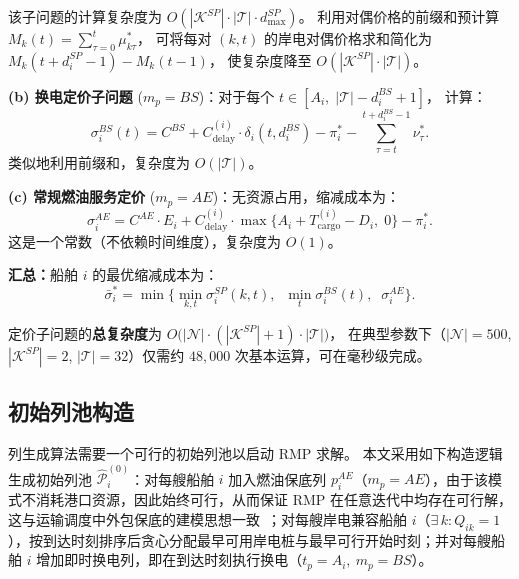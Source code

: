 \documentclass[UTF8, a4paper, 12pt]{ctexart}
\begin{document}
\noindent
该子问题的计算复杂度为 $O(|\mathcal{K}^{SP}| \cdot |\mathcal{T}| \cdot d_{\max}^{SP})$。
利用对偶价格的前缀和预计算
$M_{k}(t) = \sum_{\tau=0}^{t} \mu_{k\tau}^*$，
可将每对 $(k, t)$ 的岸电对偶价格求和简化为
$M_{k}(t + d_i^{SP} - 1) - M_{k}(t - 1)$，
使复杂度降至 $O(|\mathcal{K}^{SP}| \cdot |\mathcal{T}|)$。

\medskip
\noindent\textbf{(b) 换电定价子问题}
($m_p = BS$)：对于每个 $t \in [A_i,\; |\mathcal{T}| - d_i^{BS} + 1]$，
计算：
\begin{equation}
  \sigma_i^{BS}(t)
  = C^{BS} + C_{\text{delay}}^{(i)} \cdot \delta_i(t, d_i^{BS})
  - \pi_i^*
  - \sum_{\tau = t}^{t + d_i^{BS} - 1} \nu_{\tau}^*.
  \label{eq:price_bs}
\end{equation}
类似地利用前缀和，复杂度为 $O(|\mathcal{T}|)$。

\medskip
\noindent\textbf{(c) 常规燃油服务定价}
($m_p = AE$)：无资源占用，缩减成本为：
\begin{equation}
  \sigma_i^{AE}
  = C^{AE} \cdot E_i
  + C_{\text{delay}}^{(i)} \cdot \max\!\big\{A_i + T_{\text{cargo}}^{(i)} - D_i,\; 0\big\}
  - \pi_i^*.
  \label{eq:price_ae}
\end{equation}
这是一个常数（不依赖时间维度），复杂度为 $O(1)$。

\medskip
\noindent\textbf{汇总：}船舶 $i$ 的最优缩减成本为：
\begin{equation}
  \bar{\sigma}_i^* = \min\!\Big\{
    \min_{k,t} \sigma_i^{SP}(k,t),\;\;
    \min_{t} \sigma_i^{BS}(t),\;\;
    \sigma_i^{AE}
  \Big\}.
  \label{eq:price_min}
\end{equation}

\noindent
定价子问题的\textbf{总复杂度}为
$O\!\big(|\mathcal{N}| \cdot (|\mathcal{K}^{SP}| + 1) \cdot |\mathcal{T}|\big)$，
在典型参数下（$|\mathcal{N}| = 500$, $|\mathcal{K}^{SP}| = 2$,
$|\mathcal{T}| = 32$）仅需约 $48{,}000$ 次基本运算，可在毫秒级完成。

\subsection{初始列池构造}
\label{sec:cg_init}

列生成算法需要一个可行的初始列池以启动 RMP 求解。
本文采用如下构造逻辑生成初始列池 $\hat{\mathcal{P}}_i^{(0)}$：对每艘船舶 $i$ 加入燃油保底列 $p_i^{AE}$（$m_p = AE$），由于该模式不消耗港口资源，因此始终可行，从而保证 RMP 在任意迭代中均存在可行解，这与运输调度中外包保底的建模思想一致~\cite{Cordeau2015}；对每艘岸电兼容船舶 $i$（$\exists\, k: Q_{ik} = 1$），按到达时刻排序后贪心分配最早可用岸电桩与最早可行开始时刻；并对每艘船舶 $i$ 增加即时换电列，即在到达时刻执行换电（$t_p = A_i,\ m_p = BS$）。
\end{document}
